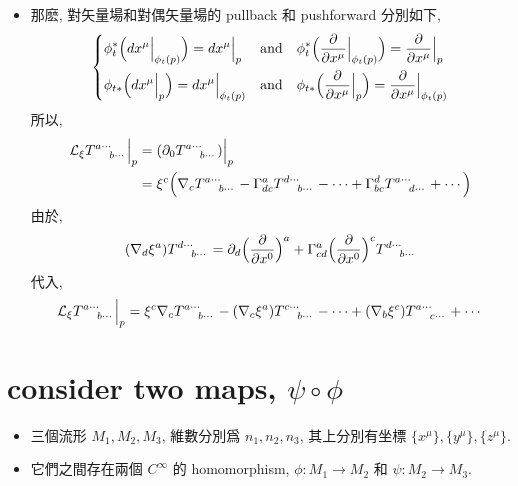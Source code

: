 \begin{itemize}
\begin{tcolorbox}[title=proof:]
\begin{itemize}
			\item 那麽, 對矢量場和對偶矢量場的 pullback 和 pushforward 分別如下, 
			\begin{equation}
				\begin{dcases}
					\phi^*_t \Big( dx^\mu \Big|_{\phi_t(p)} \Big) = dx^\mu \Big|_p & \text{and} \quad \phi^*_t \Big( \frac{\partial}{\partial x^\mu} \Big|_{\phi_t(p)} \Big) = \frac{\partial}{\partial x^\mu} \Big|_p \\
					\phi_{t *} \Big( dx^\mu \Big|_p \Big) = dx^\mu \Big|_{\phi_t(p)} & \text{and} \quad \phi_{t *} \Big( \frac{\partial}{\partial x^\mu} \Big|_p \Big) = \frac{\partial}{\partial x^\mu} \Big|_{\phi_t(p)}
				\end{dcases}
			\end{equation}
			所以,
			\begin{align}
				\mathcal{L}_\xi \tensor{T}{^{a \cdots}_{b \cdots}} \Big|_p &= (\partial_0 \tensor{T}{^{a \cdots}_{b \cdots}}) \Big|_p \notag \\
				&= \xi^c \Big( \nabla_c \tensor{T}{^{a \cdots}_{b \cdots}} - \Gamma^a_{d c} \tensor{T}{^{d \cdots}_{b \cdots}} - \cdots + \Gamma^d_{b c} \tensor{T}{^{a \cdots}_{d \cdots}} + \cdots \Big)
			\end{align}
			由於,
			\begin{equation}
				(\nabla_d \xi^a) \tensor{T}{^{d \cdots}_{b \cdots}} = \partial_d \Big( \frac{\partial}{\partial x^0} \Big)^a + \Gamma^a_{c d} \Big( \frac{\partial}{\partial x^0} \Big)^c \tensor{T}{^{d \cdots}_{b \cdots}}
			\end{equation}
			代入,
			\begin{equation}
				\mathcal{L}_\xi \tensor{T}{^{a \cdots}_{b \cdots}} \Big|_p = \xi^c \nabla_c \tensor{T}{^{a \cdots}_{b \cdots}} - (\nabla_c \xi^a) \tensor{T}{^{c \cdots}_{b \cdots}} - \cdots + (\nabla_b \xi^c) \tensor{T}{^{a \cdots}_{c \cdots}} + \cdots
			\end{equation}
		\end{itemize}
	\end{tcolorbox}
\end{itemize}

\section{consider two maps, \texorpdfstring{$\psi \circ \phi$}{psi circ phi}}
\begin{itemize}
	\item 三個流形 $M_1, M_2, M_3$, 維數分別爲 $n_1, n_2, n_3$, 其上分別有坐標 $\{ x^\mu \}, \{ y^\mu \}, \{ z^\mu \}$.
	
	\item 它們之間存在兩個 $C^\infty$ 的 homomorphism, $\phi : M_1 \rightarrow M_2$ 和 $\psi : M_2 \rightarrow M_3$.
\end{itemize}

